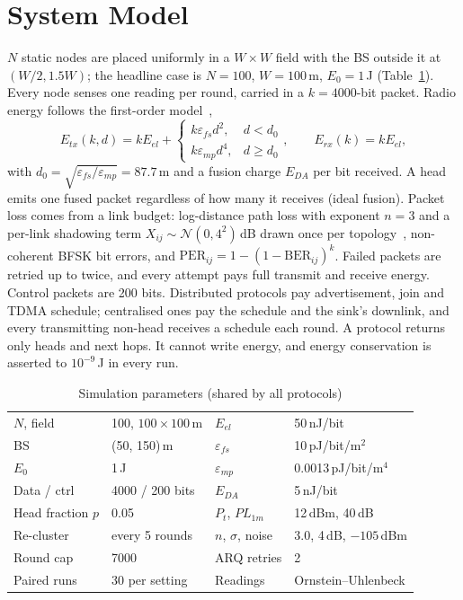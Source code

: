 \documentclass[conference]{IEEEtran}
\begin{document}
\section{System Model}
$N$ static nodes are placed uniformly in a $W\times W$ field with the BS outside it at $(W/2,1.5W)$; the headline case is $N{=}100$, $W{=}100$\,m, $E_0{=}1$\,J (Table~\ref{tab:params}). Every node senses one reading per round, carried in a $k{=}4000$-bit packet. Radio energy follows the first-order model~\cite{heinzelman2002leachc},
\begin{equation}
E_{tx}(k,d)=kE_{el}+\begin{cases}k\varepsilon_{fs}d^2, & d<d_0\\ k\varepsilon_{mp}d^4, & d\ge d_0\end{cases},\qquad E_{rx}(k)=kE_{el},
\label{eq:radio}
\end{equation}
with $d_0=\sqrt{\varepsilon_{fs}/\varepsilon_{mp}}=87.7$\,m and a fusion charge $E_{DA}$ per bit received. A head emits one fused packet regardless of how many it receives (ideal fusion). Packet loss comes from a link budget: log-distance path loss with exponent $n{=}3$ and a per-link shadowing term $X_{ij}\sim\mathcal N(0,4^2)$\,dB drawn once per topology~\cite{rappaport2002wireless}, non-coherent BFSK bit errors, and $\text{PER}_{ij}=1-(1-\text{BER}_{ij})^k$. Failed packets are retried up to twice, and every attempt pays full transmit and receive energy. Control packets are 200 bits. Distributed protocols pay advertisement, join and TDMA schedule; centralised ones pay the schedule and the sink's downlink, and every transmitting non-head receives a schedule each round. A protocol returns only heads and next hops. It cannot write energy, and energy conservation is asserted to $10^{-9}$\,J in every run.

\begin{table}[t]
\caption{Simulation parameters (shared by all protocols)}
\label{tab:params}
\centering\footnotesize
\begin{tabular}{@{}ll@{\hspace{8pt}}ll@{}}
\toprule
$N$, field & 100, $100{\times}100$\,m & $E_{el}$ & 50\,nJ/bit\\
BS & (50, 150)\,m & $\varepsilon_{fs}$ & 10\,pJ/bit/m$^2$\\
$E_0$ & 1\,J & $\varepsilon_{mp}$ & 0.0013\,pJ/bit/m$^4$\\
Data / ctrl & 4000 / 200 bits & $E_{DA}$ & 5\,nJ/bit\\
Head fraction $p$ & 0.05 & $P_t$, $PL_{1m}$ & 12\,dBm, 40\,dB\\
Re-cluster & every 5 rounds & $n$, $\sigma$, noise & 3.0, 4\,dB, $-105$\,dBm\\
Round cap & 7000 & ARQ retries & 2\\
Paired runs & 30 per setting & Readings & Ornstein--Uhlenbeck\\
\bottomrule
\end{tabular}
\end{table}
\end{document}
